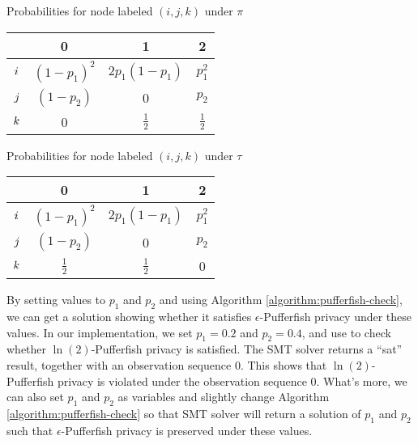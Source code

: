 \vspace{0.05\textwidth}
\begin{minipage}{\textwidth}
\centering
\begin{minipage}{0.4\textwidth}
\centering
  \makeatletter{}\makeatother\caption{Probabilities for node labeled $(i,j,k)$ under $\pi$ }
  \label{table:pi}
   \begin{tabular}{c|ccc}
& 0 & 1 & 2 \\
      \hline
      $i\vphantom{p^2}$
      & $(1-p_1)^2$
      & $2p_1(1-p_1)$
      & $p_1^2$
      \\
      $j\vphantom{p^2}$
      & $(1-p_2)$
      & 0
      & $p_2$
      \\
      $k\vphantom{p^2}$
      & 0
      & $\frac{1}{2}$
      & $\frac{1}{2}$
\end{tabular}
\end{minipage}
\hspace{0.1\textwidth}
\begin{minipage}{0.4\textwidth}
\centering
  \makeatletter{}\makeatother\caption{Probabilities for node labeled $(i,j,k)$ under $\tau$ }
  \label{table:tau}
   \begin{tabular}{c|ccc}
& 0 & 1 & 2 \\
      \hline
      $i\vphantom{p^2}$
      & $(1-p_1)^2$
      & $2p_1(1-p_1)$
      & $p_1^2$
      \\
      $j\vphantom{p^2}$
      & $(1-p_2)$
      & 0
      & $p_2$
      \\
      $k\vphantom{p^2}$
      & $\frac{1}{2}$
      & $\frac{1}{2}$
      & 0
\end{tabular}
\end{minipage}
\end{minipage}
\vspace{0.05\textwidth}


By setting values to $p_1$ and $p_2$ and using Algorithm \ref{algorithm:pufferfish-check}, we can get a solution
showing whether it satisfies $\epsilon$-Pufferfish privacy under these values.
In our implementation, we set $p_1 = 0.2$ and $p_2 = 0.4$, and use \zpython to check whether
$\ln(2)$-Pufferfish privacy is satisfied. The SMT solver returns a ``sat'' result, together with an observation
sequence $0$. This shows that $\ln(2)$-Pufferfish privacy is violated under the observation sequence $0$.
What's more, we can also set $p_1$ and $p_2$ as variables and slightly change Algorithm \ref{algorithm:pufferfish-check}
so that SMT solver will return a solution of $p_1$ and $p_2$ such that $\epsilon$-Pufferfish privacy
is preserved under these values.

